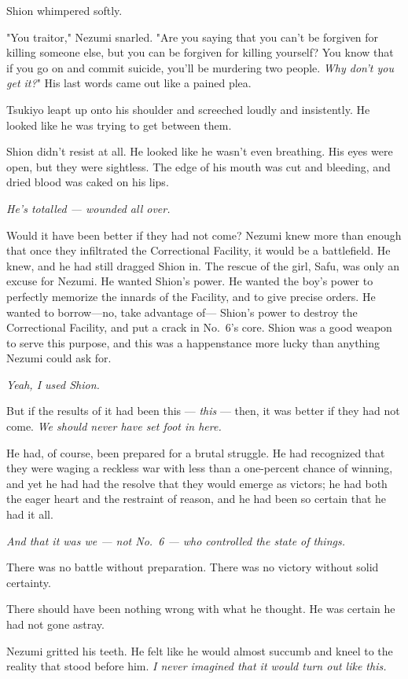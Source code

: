 Shion whimpered softly.

"You traitor," Nezumi snarled. "Are you saying that you can't be
forgiven for killing someone else, but you can be forgiven for killing
yourself? You know that if you go on and commit suicide, you'll be
murdering two people. \emph{Why don't you get it?}" His last words came out
like a pained plea.

Tsukiyo leapt up onto his shoulder and screeched loudly and insistently.
He looked like he was trying to get between them.

Shion didn't resist at all. He looked like he wasn't even breathing. His
eyes were open, but they were sightless. The edge of his mouth was cut
and bleeding, and dried blood was caked on his lips.

\emph{He's totalled --- wounded all over.}

Would it have been better if they had not come? Nezumi knew more than
enough that once they infiltrated the Correctional Facility, it would be
a battlefield. He knew, and he had still dragged Shion in. The rescue of
the girl, Safu, was only an excuse for Nezumi. He wanted Shion's power.
He wanted the boy's power to perfectly memorize the innards of the
Facility, and to give precise orders. He wanted to borrow---no, take
advantage of--- Shion's power to destroy the Correctional Facility, and
put a crack in No.~6's core. Shion was a good weapon to serve this
purpose, and this was a happenstance more lucky than anything Nezumi
could ask for.

\emph{Yeah, I used Shion.}

But if the results of it had been this --- \emph{this} --- then, it was better if
they had not come. \emph{We should never have set foot in here.}

He had, of course, been prepared for a brutal struggle. He had
recognized that they were waging a reckless war with less than a
one-percent chance of winning, and yet he had had the resolve that they
would emerge as victors; he had both the eager heart and the restraint
of reason, and he had been so certain that he had it all.

\emph{And that it was we --- not No.~6 --- who controlled the state of things.}

There was no battle without preparation. There was no victory without
solid certainty.

There should have been nothing wrong with what he thought. He was
certain he had not gone astray.

Nezumi gritted his teeth. He felt like he would almost succumb and kneel
to the reality that stood before him. \emph{I never imagined that it would
turn out like this.}

